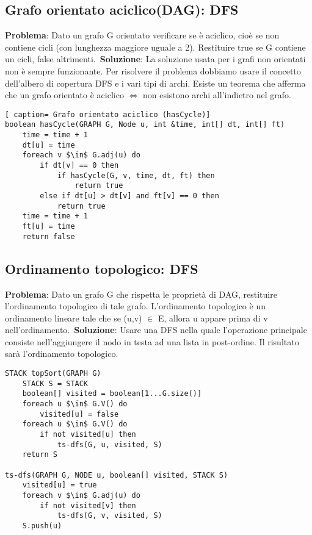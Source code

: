 \documentclass[../cheatSheetAlgoritmi.tex]{subfiles}
\begin{document}
\subsection{Grafo orientato aciclico(DAG): DFS}
\textbf{Problema}: Dato un grafo G orientato verificare se è aciclico, cioè se non contiene cicli (con lunghezza maggiore uguale a 2). Restituire true se G contiene un cicli, false altrimenti.\
\textbf{Soluzione}: La soluzione usata per i grafi non orientati non è sempre funzionante. Per risolvere il problema dobbiamo usare il concetto dell'albero di copertura DFS e i vari tipi di archi. Esiste un teorema che afferma che un grafo orientato è aciclico $\iff$ non esistono archi all'indietro nel grafo.
\newpage

\begin{lstlisting}[ caption= Grafo orientato aciclico (hasCycle)]
boolean hasCycle(GRAPH G, Node u, int &time, int[] dt, int[] ft)
	time = time + 1
	dt[u] = time
	foreach v $\in$ G.adj(u) do
		if dt[v] == 0 then
			if hasCycle(G, v, time, dt, ft) then
				return true
		else if dt[u] > dt[v] and ft[v] == 0 then
			return true
	time = time + 1
	ft[u] = time
	return false
\end{lstlisting}


\subsection{Ordinamento topologico: DFS}
\textbf{Problema}: Dato un grafo G che rispetta le proprietà di DAG, restituire l'ordinamento topologico di tale grafo. L'ordinamento topologico è un ordinamento lineare tale che se (u,v) $\in$ E, allora u appare prima di v nell'ordinamento.\
\textbf{Soluzione}: Usare una DFS nella quale l'operazione principale consiste nell'aggiungere il nodo in testa ad una lista in post-ordine. Il risultato sarà l'ordinamento topologico. 
\begin{lstlisting}[caption= Ordinamento topologico]
STACK topSort(GRAPH G)
	STACK S = STACK
	boolean[] visited = boolean[1...G.size()]
	foreach u $\in$ G.V() do 
		visited[u] = false
	foreach u $\in$ G.V() do
		if not visited[u] then
			ts-dfs(G, u, visited, S)
	return S
	
ts-dfs(GRAPH G, NODE u, boolean[] visited, STACK S)
	visited[u] = true
	foreach v $\in$ G.adj(u) do
		if not visited[v] then
			ts-dfs(G, v, visited, S)
	S.push(u)
\end{lstlisting}
\end{document}
